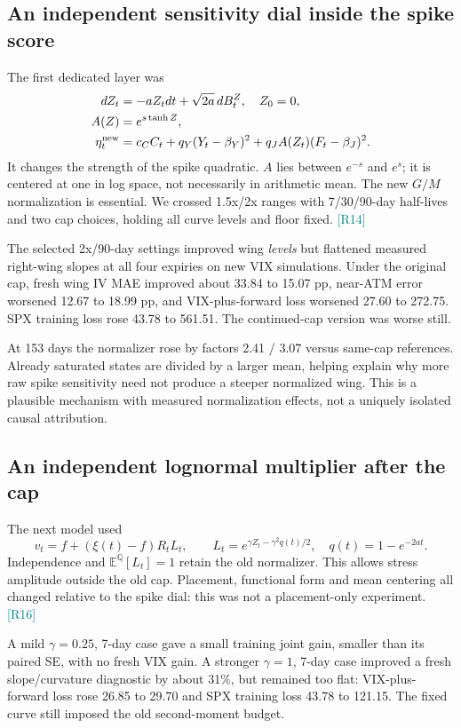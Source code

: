 \documentclass[11pt,a4paper]{article}
\newcommand{\E}{\mathbb E^{\mathbb Q}}
\newcommand{\src}[1]{\textcolor{teal}{\small[#1]}}
\begin{document}
\subsection{An independent sensitivity dial inside the spike score}
The first dedicated layer was
\begin{align}
dZ_t&=-aZ_tdt+\sqrt{2a}\,dB_t^Z,\quad Z_0=0,\\
A(Z)&=e^{s\tanh Z},\\
\eta_t^{\rm new}&=c_CC_t+q_Y(Y_t-\beta_Y)^2+q_JA(Z_t)(F_t-\beta_J)^2.
\end{align}
It changes the strength of the spike quadratic. $A$ lies between $e^{-s}$ and $e^s$; it is centered at one in log space, not necessarily in arithmetic mean. The new $G/M$ normalization is essential. We crossed 1.5x/2x ranges with 7/30/90-day half-lives and two cap choices, holding all curve levels and floor fixed. \src{R14}

The selected 2x/90-day settings improved wing \emph{levels} but flattened measured right-wing slopes at all four expiries on new VIX simulations. Under the original cap, fresh wing IV MAE improved about 33.84 to 15.07 pp, near-ATM error worsened 12.67 to 18.99 pp, and VIX-plus-forward loss worsened 27.60 to 272.75. SPX training loss rose 43.78 to 561.51. The continued-cap version was worse still.

At 153 days the normalizer rose by factors 2.41 / 3.07 versus same-cap references. Already saturated states are divided by a larger mean, helping explain why more raw spike sensitivity need not produce a steeper normalized wing. This is a plausible mechanism with measured normalization effects, not a uniquely isolated causal attribution.

\subsection{An independent lognormal multiplier after the cap}
The next model used
\begin{equation}
v_t=f+(\xi(t)-f)R_tL_t,\qquad
L_t=e^{\gamma Z_t-\gamma^2q(t)/2},\quad q(t)=1-e^{-2at}.
\end{equation}
Independence and $\E[L_t]=1$ retain the old normalizer. This allows stress amplitude outside the old cap. Placement, functional form and mean centering all changed relative to the spike dial: this was not a placement-only experiment. \src{R16}

A mild $\gamma=0.25$, 7-day case gave a small training joint gain, smaller than its paired SE, with no fresh VIX gain. A stronger $\gamma=1$, 7-day case improved a fresh slope/curvature diagnostic by about 31\%, but remained too flat: VIX-plus-forward loss rose 26.85 to 29.70 and SPX training loss 43.78 to 121.15. The fixed curve still imposed the old second-moment budget.
\end{document}
